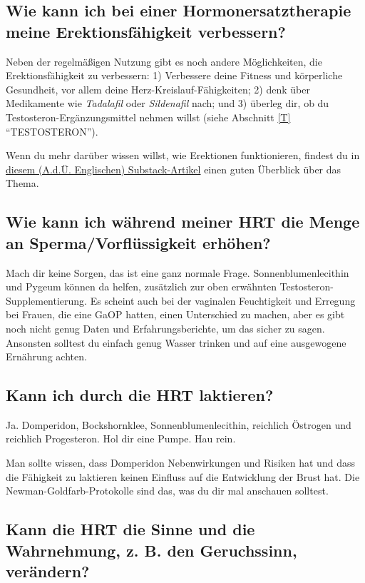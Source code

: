 \documentclass{article}
\begin{document}
\subsection{Wie kann ich bei einer Hormonersatztherapie meine Erektionsfähigkeit verbessern?}\label{11-20}

Neben der regelmäßigen Nutzung gibt es noch andere Möglichkeiten, die Erektionsfähigkeit zu verbessern: 1) Verbessere deine Fitness und körperliche Gesundheit, vor allem deine Herz-Kreislauf-Fähigkeiten; 2) denk über Medikamente wie \textit{Tadalafil} oder \textit{Sildenafil} nach; und 3) überleg dir, ob du Testosteron-Ergänzungsmittel nehmen willst (siehe Abschnitt \ref{T} “TESTOSTERON”).

Wenn du mehr darüber wissen willst, wie Erektionen funktionieren, findest du in \href{https://stainedglasswoman.substack.com/p/how-to-maintain-your-penis-function}{diesem (A.d.Ü. Englischen) Substack-Artikel} einen guten Überblick über das Thema.

\subsection{Wie kann ich während meiner HRT die Menge an Sperma/Vorflüssigkeit erhöhen?}

Mach dir keine Sorgen, das ist eine ganz normale Frage. Sonnenblumenlecithin und Pygeum können da helfen, zusätzlich zur oben erwähnten Testosteron-Supplementierung. Es scheint auch bei der vaginalen Feuchtigkeit und Erregung bei Frauen, die eine GaOP hatten, einen Unterschied zu machen, aber es gibt noch nicht genug Daten und Erfahrungsberichte, um das sicher zu sagen. Ansonsten solltest du einfach genug Wasser trinken und auf eine ausgewogene Ernährung achten.

\subsection{Kann ich durch die HRT laktieren?}

Ja. Domperidon, Bockshornklee, Sonnenblumenlecithin, reichlich Östrogen und reichlich Progesteron. Hol dir eine Pumpe. Hau rein.

Man sollte wissen, dass Domperidon Nebenwirkungen und Risiken hat und dass die Fähigkeit zu laktieren keinen Einfluss auf die Entwicklung der Brust hat. Die Newman-Goldfarb-Protokolle sind das, was du dir mal anschauen solltest.

\subsection{Kann die HRT die Sinne und die Wahrnehmung, z. B. den Geruchssinn, verändern?}
\end{document}
